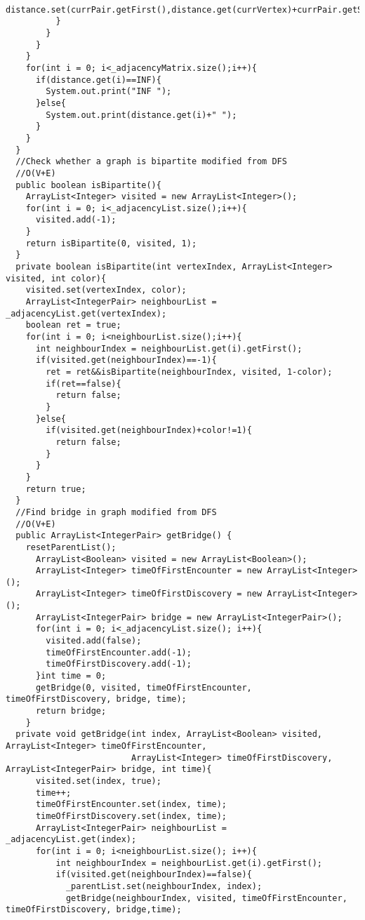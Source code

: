 \documentclass[11pt]{article}
\theoremstyle{definition}
\begin{document}
\begin{verbatim}
            distance.set(currPair.getFirst(),distance.get(currVertex)+currPair.getSecond());
          }
        }
      }
    }
    for(int i = 0; i<_adjacencyMatrix.size();i++){
      if(distance.get(i)==INF){
        System.out.print("INF ");
      }else{
        System.out.print(distance.get(i)+" ");
      }
    }
  }
  //Check whether a graph is bipartite modified from DFS
  //O(V+E)
  public boolean isBipartite(){
    ArrayList<Integer> visited = new ArrayList<Integer>();
    for(int i = 0; i<_adjacencyList.size();i++){
      visited.add(-1);
    }
    return isBipartite(0, visited, 1);
  }
  private boolean isBipartite(int vertexIndex, ArrayList<Integer> visited, int color){
    visited.set(vertexIndex, color);
    ArrayList<IntegerPair> neighbourList = _adjacencyList.get(vertexIndex);
    boolean ret = true;
    for(int i = 0; i<neighbourList.size();i++){
      int neighbourIndex = neighbourList.get(i).getFirst();
      if(visited.get(neighbourIndex)==-1){
        ret = ret&&isBipartite(neighbourIndex, visited, 1-color);
        if(ret==false){
          return false;
        }
      }else{
        if(visited.get(neighbourIndex)+color!=1){
          return false;
        }
      }
    }
    return true;
  }
  //Find bridge in graph modified from DFS
  //O(V+E)
  public ArrayList<IntegerPair> getBridge() {
    resetParentList();
      ArrayList<Boolean> visited = new ArrayList<Boolean>();
      ArrayList<Integer> timeOfFirstEncounter = new ArrayList<Integer>();
      ArrayList<Integer> timeOfFirstDiscovery = new ArrayList<Integer>();
      ArrayList<IntegerPair> bridge = new ArrayList<IntegerPair>();
      for(int i = 0; i<_adjacencyList.size(); i++){
        visited.add(false);
        timeOfFirstEncounter.add(-1);
        timeOfFirstDiscovery.add(-1);
      }int time = 0;
      getBridge(0, visited, timeOfFirstEncounter, timeOfFirstDiscovery, bridge, time);
      return bridge;
    }
  private void getBridge(int index, ArrayList<Boolean> visited, ArrayList<Integer> timeOfFirstEncounter,
                         ArrayList<Integer> timeOfFirstDiscovery, ArrayList<IntegerPair> bridge, int time){
      visited.set(index, true);
      time++;
      timeOfFirstEncounter.set(index, time);
      timeOfFirstDiscovery.set(index, time);
      ArrayList<IntegerPair> neighbourList =  _adjacencyList.get(index);
      for(int i = 0; i<neighbourList.size(); i++){
          int neighbourIndex = neighbourList.get(i).getFirst();
          if(visited.get(neighbourIndex)==false){
            _parentList.set(neighbourIndex, index);
            getBridge(neighbourIndex, visited, timeOfFirstEncounter, timeOfFirstDiscovery, bridge,time);

\end{verbatim}
\end{document}
